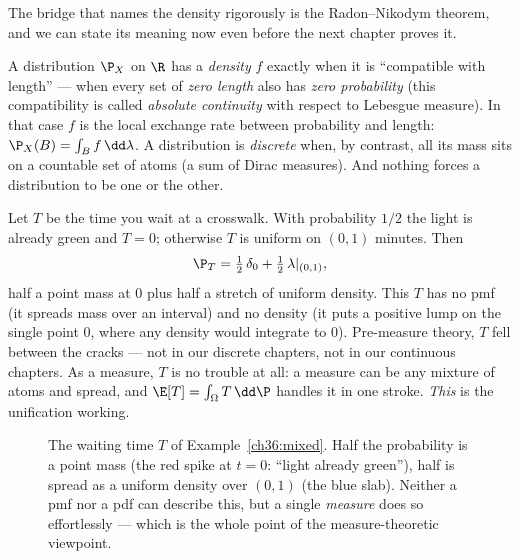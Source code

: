 The bridge that names the density rigorously is the Radon--Nikodym theorem, and we
can state its meaning now even before the next chapter proves it.

\begin{focusbox}
A distribution $\P_X$ on $\R$ has a \emph{density} $f$ exactly when it is
``compatible with length'' --- when every set of \emph{zero length} also has
\emph{zero probability} (this compatibility is called \emph{absolute continuity}
with respect to Lebesgue measure). In that case $f$ is the local exchange rate
between probability and length: $\P_X(B) = \int_B f\,\dd\lambda$. A distribution is
\emph{discrete} when, by contrast, all its mass sits on a countable set of atoms
(a sum of Dirac measures). And nothing forces a distribution to be one or the
other.
\end{focusbox}

\begin{example}
\label{ch36:mixed}
Let $T$ be the time you wait at a crosswalk. With probability $1/2$ the light is
already green and $T = 0$; otherwise $T$ is uniform on $(0,1)$ minutes. Then
\[
  \P_T = \tfrac{1}{2}\,\delta_0 + \tfrac{1}{2}\,\lambda|_{(0,1)},
\]
half a point mass at $0$ plus half a stretch of uniform density. This $T$ has no
pmf (it spreads mass over an interval) and no density (it puts a positive lump on
the single point $0$, where any density would integrate to $0$). Pre-measure
theory, $T$ fell between the cracks --- not in our discrete chapters, not in our
continuous chapters. As a measure, $T$ is no trouble at all: a measure can be any
mixture of atoms and spread, and $\E[T] = \int_{\Omega} T\,\dd\P$ handles it in one
stroke. \emph{This} is the unification working.
\end{example}

\begin{figure}[H]
\centering
{}
\caption{The waiting time $T$ of Example~\ref{ch36:mixed}. Half the probability
is a point mass (the red spike at $t=0$: ``light already green''), half is spread
as a uniform density over $(0,1)$ (the blue slab). Neither a pmf nor a pdf can
describe this, but a single \emph{measure} does so effortlessly --- which is the
whole point of the measure-theoretic viewpoint.}
\label{ch36:fig-mixed}
\end{figure}

